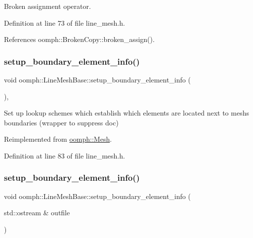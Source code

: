 Broken assignment operator. 



Definition at line 73 of file line\+\_\+mesh.\+h.



References oomph\+::\+Broken\+Copy\+::broken\+\_\+assign().

\mbox{\label{classoomph_1_1LineMeshBase_ac630cc88daeec61aff7335c2b1d77d91}} 
\subsubsection{\texorpdfstring{setup\+\_\+boundary\+\_\+element\+\_\+info()}{setup\_boundary\_element\_info()}\hspace{0.1cm}{\footnotesize\ttfamily [1/2]}}
{\footnotesize\ttfamily void oomph\+::\+Line\+Mesh\+Base\+::setup\+\_\+boundary\+\_\+element\+\_\+info (\begin{DoxyParamCaption}{ }\end{DoxyParamCaption})\hspace{0.3cm}{\ttfamily [inline]}, {\ttfamily [virtual]}}

Set up lookup schemes which establish which elements are located next to mesh\textquotesingle{}s boundaries (wrapper to suppress doc) 

Reimplemented from \hyperlink{classoomph_1_1Mesh_a6cc8bcd6b41209f0e9295cc993d9c6bb}{oomph\+::\+Mesh}.



Definition at line 83 of file line\+\_\+mesh.\+h.

\mbox{\label{classoomph_1_1LineMeshBase_a309fc1aa6fe508a32cd6c0e863d5b1c6}} 
\subsubsection{\texorpdfstring{setup\+\_\+boundary\+\_\+element\+\_\+info()}{setup\_boundary\_element\_info()}\hspace{0.1cm}{\footnotesize\ttfamily [2/2]}}
{\footnotesize\ttfamily void oomph\+::\+Line\+Mesh\+Base\+::setup\+\_\+boundary\+\_\+element\+\_\+info (\begin{DoxyParamCaption}\item[{std\+::ostream \&}]{outfile }\end{DoxyParamCaption})\hspace{0.3cm}{\ttfamily [virtual]}}



